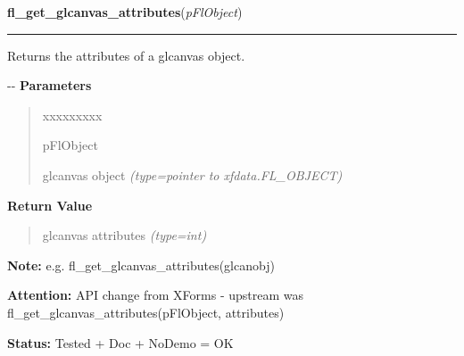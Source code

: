 \hspace{.8\funcindent}\begin{boxedminipage}{\funcwidth}

    \raggedright \textbf{fl\_get\_glcanvas\_attributes}(\textit{pFlObject})

    \vspace{-1.5ex}

    \rule{\textwidth}{0.5\fboxrule}
\setlength{\parskip}{2ex}

Returns the attributes of a glcanvas object.

-{}-
\setlength{\parskip}{1ex}
      \textbf{Parameters}
      \vspace{-1ex}

      \begin{quote}
        \begin{Ventry}{xxxxxxxxx}

          \item[pFlObject]


glcanvas object
            {\it (type=pointer to xfdata.FL\_OBJECT)}

        \end{Ventry}

      \end{quote}

      \textbf{Return Value}
    \vspace{-1ex}

      \begin{quote}

glcanvas attributes
      {\it (type=int)}

      \end{quote}

\textbf{Note:} 
e.g. fl\_get\_glcanvas\_attributes(glcanobj)


\textbf{Attention:} 
API change from XForms - upstream was
fl\_get\_glcanvas\_attributes(pFlObject, attributes)


\textbf{Status:} 
Tested + Doc + NoDemo = OK


    \end{boxedminipage}

    \label{xformslib:flglcanvas:fl_set_glcanvas_direct}

    \vspace{0.5ex}

